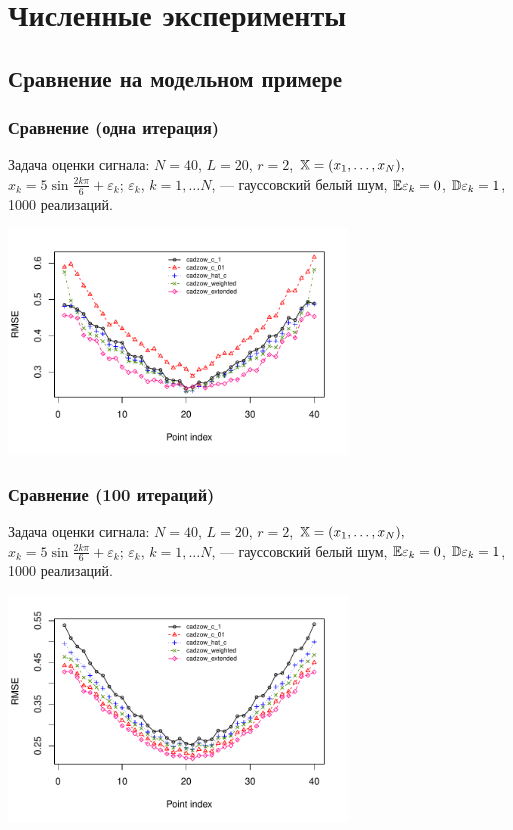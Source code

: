 \documentclass[unicode, notheorems]{beamer}
\begin{document}
 
\section{Численные эксперименты}
\subsection{Сравнение на модельном примере}
\begin{frame}
	\frametitle{Сравнение (одна итерация)}
	Задача оценки сигнала: $N = 40$, $L = 20$, $r = 2$, $\mathbb{X} = (x_{1}, \ldots, x_N),$  $x_k = 5\sin{\frac{2 k \pi}{6}} + \varepsilon_k$; $\varepsilon_k$, $k = 1, \ldots N$, --- гауссовский белый шум, $\mathbb{E} \varepsilon_k = 0$, $\mathbb{D} \varepsilon_k = 1$, 1000 реализаций.

	\vspace{-0.3cm}
	\begin{center}
		\includegraphics*[width = 9cm]{s1_it1.pdf}
	\end{center}
\end{frame}

\begin{frame}
	\frametitle{Сравнение (100 итераций)}
	Задача оценки сигнала: $N = 40$, $L = 20$, $r = 2$, $\mathbb{X} = (x_{1}, \ldots, x_N),$  $x_k = 5\sin{\frac{2 k \pi}{6}} + \varepsilon_k$; $\varepsilon_k$, $k = 1, \ldots N$, --- гауссовский белый шум, $\mathbb{E} \varepsilon_k = 0$, $\mathbb{D} \varepsilon_k = 1$, 1000 реализаций.
	\vspace{-0.3cm}
	
	\begin{center}
		\includegraphics*[width = 9cm]{s1_it100.pdf}
	\end{center}
\end{frame}
\end{document}
